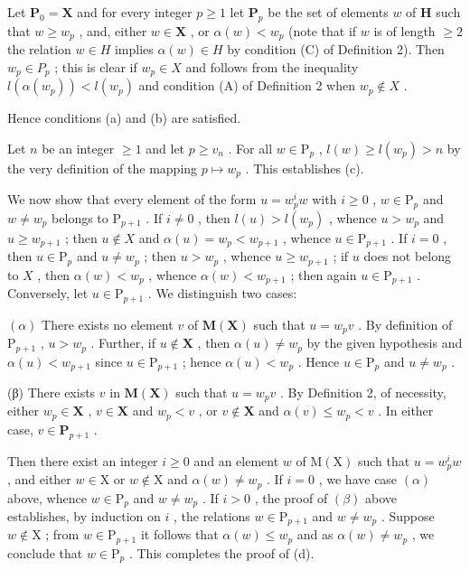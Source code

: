 Let \(\mathbf{P}_0 = \mathbf{X}\) and for every integer \(p \geqslant 1\) let \(\mathbf{P}_p\) be the set of elements \(w\) of \(\mathbf{H}\) such that \(w \geqslant w_p\) , and, either \(w \in \mathbf{X}\) , or \(\alpha(w) < w_p\) (note that if \(w\) is of length \(\geqslant2\) the relation \(w\in H\) implies \(\alpha(w)\in H\) by condition (C) of Definition 2). Then \(w_{p}\in P_{p}\) ; this is clear if \(w_{p}\in X\) and follows from the inequality \(l(\alpha(w_{p}))<l(w_{p})\) and condition (A) of Definition 2 when \(w_{p}\notin X\) .

Hence conditions (a) and (b) are satisfied.

Let \(n\) be an integer \(\geqslant 1\) and let \(p \geqslant v_n\) . For all \(w \in \mathrm{P}_p\) , \(l(w) \geqslant l(w_p) > n\) by the very definition of the mapping \(p \mapsto w_p\) . This establishes (c).

We now show that every element of the form \(u = w_{p}^{i}w\) with \(i \geqslant 0\) , \(w \in \mathrm{P}_{p}\) and \(w \neq w_{p}\) belongs to \(\mathrm{P}_{p+1}\) . If \(i \neq 0\) , then \(l(u) > l(w_{p})\) , whence \(u > w_{p}\) and \(u \geqslant w_{p+1}\) ; then \(u \notin X\) and \(\alpha(u) = w_{p} < w_{p+1}\) , whence \(u \in \mathrm{P}_{p+1}\) . If \(i = 0\) , then \(u \in \mathrm{P}_{p}\) and \(u \neq w_{p}\) ; then \(u > w_{p}\) , whence \(u \geqslant w_{p+1}\) ; if \(u\) does not belong to \(X\) , then \(\alpha(w) < w_{p}\) , whence \(\alpha(w) < w_{p+1}\) ; then again \(u \in \mathrm{P}_{p+1}\) . Conversely, let \(u \in \mathrm{P}_{p+1}\) . We distinguish two cases:

\((\alpha)\) There exists no element \(v\) of \(\mathbf{M}(\mathbf{X})\) such that \(u = w_{p}v\) . By definition of \(\mathrm{P}_{p + 1}\) , \(u > w_{p}\) . Further, if \(u\notin \mathbf{X}\) , then \(\alpha (u)\neq w_p\) by the given hypothesis and \(\alpha (u) < w_{p + 1}\) since \(u\in \mathrm{P}_{p + 1}\) ; hence \(\alpha (u) < w_{p}\) . Hence \(u\in \mathrm{P}_p\) and \(u\neq w_{p}\) .

(β) There exists \(v\) in \(\mathbf{M}(\mathbf{X})\) such that \(u = w_{p}v\) . By Definition 2, of necessity, either \(w_{p} \in \mathbf{X}\) , \(v \in \mathbf{X}\) and \(w_{p} < v\) , or \(v \notin \mathbf{X}\) and \(\alpha(v) \leqslant w_{p} < v\) . In either case, \(v \in \mathbf{P}_{p+1}\) .

Then there exist an integer \(i \geqslant 0\) and an element \(w\) of \(\mathrm{M}(\mathrm{X})\) such that \(u = w_p^i w\) , and either \(w \in \mathrm{X}\) or \(w \notin \mathrm{X}\) and \(\alpha(w) \neq w_p\) . If \(i = 0\) , we have case \((\alpha)\) above, whence \(w \in \mathrm{P}_p\) and \(w \neq w_p\) . If \(i > 0\) , the proof of \((\beta)\) above establishes, by induction on \(i\) , the relations \(w \in \mathrm{P}_{p+1}\) and \(w \neq w_p\) . Suppose \(w \notin \mathrm{X}\) ; from \(w \in \mathrm{P}_{p+1}\) it follows that \(\alpha(w) \leqslant w_p\) and as \(\alpha(w) \neq w_p\) , we conclude that \(w \in \mathrm{P}_p\) . This completes the proof of (d).

